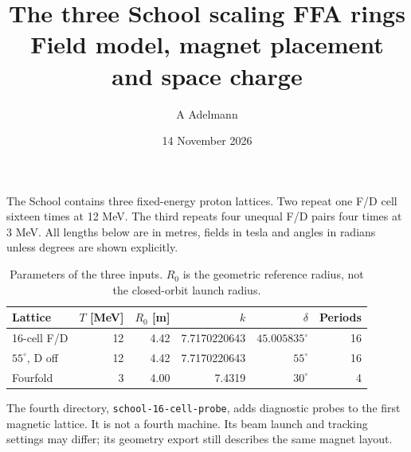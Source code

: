 \documentclass[11pt,a4paper]{article}
\title{The three School scaling FFA rings\\\large Field model, magnet placement and space charge}
\author{A Adelmann}
\date{14 November 2026}
\newcommand{\degunit}{^{\circ}}
\begin{document}
\maketitle
\vspace{-2em}
The School contains three fixed-energy proton lattices. Two repeat one F/D cell
sixteen times at 12 MeV. The third repeats four unequal F/D pairs four times at
3 MeV. All lengths below are in metres, fields in tesla and angles in radians
unless degrees are shown explicitly.

\begin{table}[h]
\centering
\caption{Parameters of the three inputs. $R_0$ is the geometric reference radius,
not the closed-orbit launch radius.}
\begin{tabular}{@{}lrrrrr@{}}
\toprule
Lattice & $T$ [MeV] & $R_0$ [m] & $k$ & $\delta$ & Periods\\
\midrule
16-cell F/D & 12 & 4.42 & 7.7170220643 & $45.005835\degunit$ & 16\\
$55\degunit$, D off & 12 & 4.42 & 7.7170220643 & $55\degunit$ & 16\\
Fourfold & 3 & 4.00 & 7.4319 & $30\degunit$ & 4\\
\bottomrule
\end{tabular}
\end{table}
The fourth directory, \texttt{school-16-cell-probe}, adds diagnostic probes to the
first magnetic lattice. It is not a fourth machine. Its beam launch and tracking
settings may differ; its geometry export still describes the same magnet layout.
\end{document}
